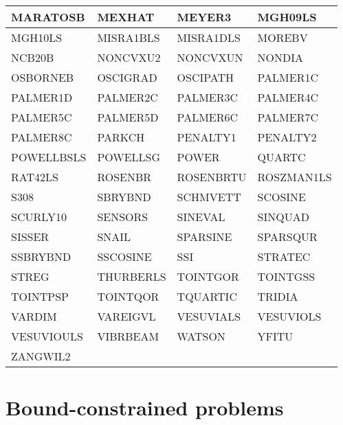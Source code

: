 \begin{longtable}{llll}
    \midrule
    MARATOSB    & MEXHAT        & MEYER3        & MGH09LS\\
    \midrule
    MGH10LS     & MISRA1BLS     & MISRA1DLS     & MOREBV\\
    \midrule
    NCB20B      & NONCVXU2      & NONCVXUN      & NONDIA\\
    \midrule
    OSBORNEB    & OSCIGRAD      & OSCIPATH      & PALMER1C\\
    \midrule
    PALMER1D    & PALMER2C      & PALMER3C      & PALMER4C\\
    \midrule
    PALMER5C    & PALMER5D      & PALMER6C      & PALMER7C\\
    \midrule
    PALMER8C    & PARKCH        & PENALTY1      & PENALTY2\\
    \midrule
    POWELLBSLS  & POWELLSG      & POWER         & QUARTC\\
    \midrule
    RAT42LS     & ROSENBR       & ROSENBRTU     & ROSZMAN1LS\\
    \midrule
    S308        & SBRYBND       & SCHMVETT      & SCOSINE\\
    \midrule
    SCURLY10    & SENSORS       & SINEVAL       & SINQUAD\\
    \midrule
    SISSER      & SNAIL         & SPARSINE      & SPARSQUR\\
    \midrule
    SSBRYBND    & SSCOSINE      & SSI           & STRATEC\\
    \midrule
    STREG       & THURBERLS     & TOINTGOR      & TOINTGSS\\
    \midrule
    TOINTPSP    & TOINTQOR      & TQUARTIC      & TRIDIA\\
    \midrule
    VARDIM      & VAREIGVL      & VESUVIALS     & VESUVIOLS\\
    \midrule
    VESUVIOULS  & VIBRBEAM      & WATSON        & YFITU\\
    \midrule
    ZANGWIL2\\
    \bottomrule
\end{longtable}

\section{Bound-constrained problems}
\label{sec:list-bound-constrained-problems}

